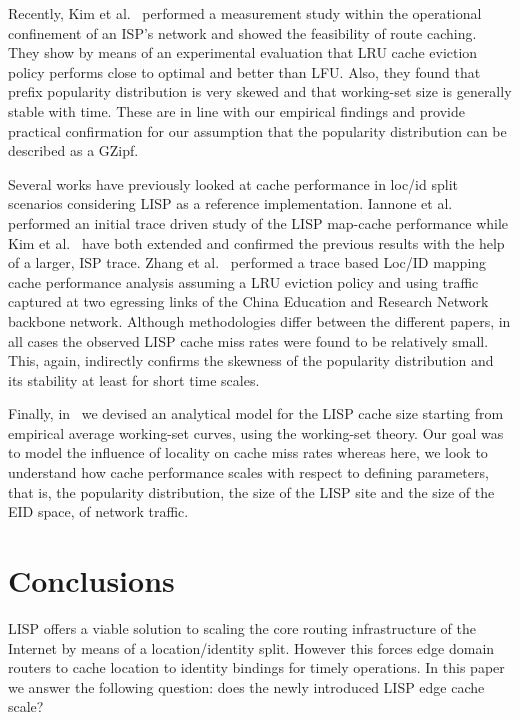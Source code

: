 \documentclass[twocolumn, 10pt]{article}
\theoremstyle{plain}
\begin{document}
Recently, Kim et al.~\cite{kim:rcaching} performed a measurement study within
the operational confinement of an ISP's network and showed the feasibility of
route caching. They show by means of an experimental evaluation that LRU cache
eviction policy performs close to optimal and better than LFU. Also, they
found  that prefix popularity distribution is very skewed and that working-set
size is generally stable with time. These are in line with our empirical
findings and provide practical confirmation for our assumption that the
popularity distribution can be described as a GZipf. 

Several works have previously looked at cache performance in loc/id split
scenarios considering LISP as a reference implementation. Iannone et
al.~\cite{iannone:lcache} performed an initial trace driven study of the LISP
map-cache performance while Kim et al.~\cite{jkim:lcache} have both extended
and confirmed the previous results with the help of a larger, ISP trace.
Zhang et al.~\cite{zhang:lcache} performed a trace based Loc/ID mapping cache
performance analysis assuming a LRU eviction policy and using traffic captured
at two egressing links of the China Education and Research Network backbone
network. Although methodologies differ between the different papers, in all
cases the observed LISP cache miss rates were found to be relatively small.
This, again, indirectly confirms the skewness of the popularity distribution
and its stability at least for short time scales. 

Finally, in~\cite{coras:lcache_n} we devised an analytical model for the LISP
cache size starting from empirical average working-set curves, using the
working-set theory. Our goal was to model the influence of locality on cache
miss rates whereas here, we look to understand how cache performance scales with
respect to defining parameters, that is, the popularity distribution, the size
of the LISP site and the size of the EID space, of network traffic.


 
\section{Conclusions}\label{sec:conclusions}

LISP offers a viable solution to scaling the core routing infrastructure of
the Internet by means of a location/identity split. However this forces edge
domain routers to cache location to identity bindings for timely operations.
In this paper we answer the following question: does the newly introduced LISP
edge cache scale?
\end{document}
